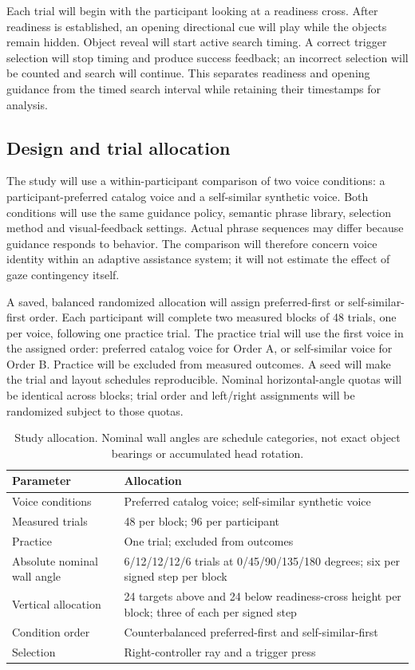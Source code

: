 \documentclass[11pt,letterpaper]{article}
\begin{document}
Each trial will begin with the participant looking at a readiness cross. After readiness is established, an opening directional cue will play while the objects remain hidden. Object reveal will start active search timing. A correct trigger selection will stop timing and produce success feedback; an incorrect selection will be counted and search will continue. This separates readiness and opening guidance from the timed search interval while retaining their timestamps for analysis.

\subsection{Design and trial allocation}
The study will use a within-participant comparison of two voice conditions: a participant-preferred catalog voice and a self-similar synthetic voice. Both conditions will use the same guidance policy, semantic phrase library, selection method and visual-feedback settings. Actual phrase sequences may differ because guidance responds to behavior. The comparison will therefore concern voice identity within an adaptive assistance system; it will not estimate the effect of gaze contingency itself.

A saved, balanced randomized allocation will assign preferred-first or self-similar-first order. Each participant will complete two measured blocks of 48 trials, one per voice, following one practice trial. The practice trial will use the first voice in the assigned order: preferred catalog voice for Order A, or self-similar voice for Order B. Practice will be excluded from measured outcomes. A seed will make the trial and layout schedules reproducible. Nominal horizontal-angle quotas will be identical across blocks; trial order and left/right assignments will be randomized subject to those quotas.

\begin{table}[htbp]\centering
\caption{Study allocation. Nominal wall angles are schedule categories, not exact object bearings or accumulated head rotation.}
\begin{tabularx}{\linewidth}{@{}lX@{}}\toprule
Parameter & Allocation \\\midrule
Voice conditions & Preferred catalog voice; self-similar synthetic voice \\
Measured trials & 48 per block; 96 per participant \\
Practice & One trial; excluded from outcomes \\
Absolute nominal wall angle & 6/12/12/12/6 trials at 0/45/90/135/180 degrees; six per signed step per block \\
Vertical allocation & 24 targets above and 24 below readiness-cross height per block; three of each per signed step \\
Condition order & Counterbalanced preferred-first and self-similar-first \\
Selection & Right-controller ray and a trigger press \\\bottomrule
\end{tabularx}
\end{table}
\end{document}
